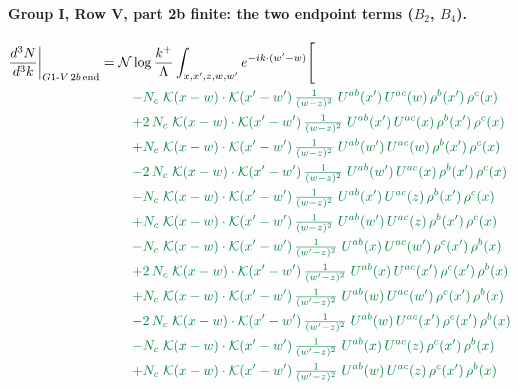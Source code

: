 \documentclass[10pt]{article}
\numberwithin{equation}{section}
\newcommand{\NN}{\mathcal N\log\frac{k^+}{\Lambda}}
\begin{document}
\paragraph{Group I, Row V, part 2b finite: the two endpoint terms ($B_2$, $B_4$).}
\begin{align}
\frac{d^3N}{d^3k}\bigg|_{G1\text{-}V\,2b\,{\rm end}}={}&\NN\int_{x,x',z,w,w'}e^{-ik\cdot(w'-w)}\Bigg[\notag\\
&\quad{\color{JIM}-N_c\;\mathcal{K}(x-w)\cdot\mathcal{K}(x'-w')\,\tfrac{1}{(w-z)^{2}}\;U^{ab}(x')\,U^{ac}(w)\,\rho^{b}(x')\,\rho^{c}(x)}\notag\\
&\quad{\color{JIM}+2\,N_c\;\mathcal{K}(x-w)\cdot\mathcal{K}(x'-w')\,\tfrac{1}{(w-z)^{2}}\;U^{ab}(x')\,U^{ac}(x)\,\rho^{b}(x')\,\rho^{c}(x)}\notag\\
&\quad{\color{JIM}+N_c\;\mathcal{K}(x-w)\cdot\mathcal{K}(x'-w')\,\tfrac{1}{(w-z)^{2}}\;U^{ab}(w')\,U^{ac}(w)\,\rho^{b}(x')\,\rho^{c}(x)}\notag\\
&\quad{\color{JIM}-2\,N_c\;\mathcal{K}(x-w)\cdot\mathcal{K}(x'-w')\,\tfrac{1}{(w-z)^{2}}\;U^{ab}(w')\,U^{ac}(x)\,\rho^{b}(x')\,\rho^{c}(x)}\notag\\
&\quad{\color{JIM}-N_c\;\mathcal{K}(x-w)\cdot\mathcal{K}(x'-w')\,\tfrac{1}{(w-z)^{2}}\;U^{ab}(x')\,U^{ac}(z)\,\rho^{b}(x')\,\rho^{c}(x)}\notag\\
&\quad{\color{JIM}+N_c\;\mathcal{K}(x-w)\cdot\mathcal{K}(x'-w')\,\tfrac{1}{(w-z)^{2}}\;U^{ab}(w')\,U^{ac}(z)\,\rho^{b}(x')\,\rho^{c}(x)}\notag\\
&\quad{\color{JIM}-N_c\;\mathcal{K}(x-w)\cdot\mathcal{K}(x'-w')\,\tfrac{1}{(w'-z)^{2}}\;U^{ab}(x)\,U^{ac}(w')\,\rho^{c}(x')\,\rho^{b}(x)}\notag\\
&\quad{\color{JIM}+2\,N_c\;\mathcal{K}(x-w)\cdot\mathcal{K}(x'-w')\,\tfrac{1}{(w'-z)^{2}}\;U^{ab}(x)\,U^{ac}(x')\,\rho^{c}(x')\,\rho^{b}(x)}\notag\\
&\quad{\color{JIM}+N_c\;\mathcal{K}(x-w)\cdot\mathcal{K}(x'-w')\,\tfrac{1}{(w'-z)^{2}}\;U^{ab}(w)\,U^{ac}(w')\,\rho^{c}(x')\,\rho^{b}(x)}\notag\\
&\quad{\color{JIM}-2\,N_c\;\mathcal{K}(x-w)\cdot\mathcal{K}(x'-w')\,\tfrac{1}{(w'-z)^{2}}\;U^{ab}(w)\,U^{ac}(x')\,\rho^{c}(x')\,\rho^{b}(x)}\notag\\
&\quad{\color{JIM}-N_c\;\mathcal{K}(x-w)\cdot\mathcal{K}(x'-w')\,\tfrac{1}{(w'-z)^{2}}\;U^{ab}(x)\,U^{ac}(z)\,\rho^{c}(x')\,\rho^{b}(x)}\notag\\
&\quad{\color{JIM}+N_c\;\mathcal{K}(x-w)\cdot\mathcal{K}(x'-w')\,\tfrac{1}{(w'-z)^{2}}\;U^{ab}(w)\,U^{ac}(z)\,\rho^{c}(x')\,\rho^{b}(x)}\notag\\

\end{align}
\end{document}
